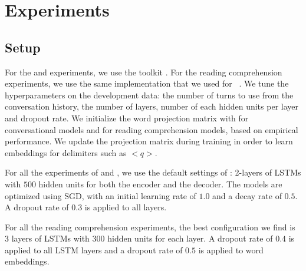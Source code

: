 
\section{Experiments}
\label{sec:coqa-experiments}

\subsection{Setup}
For the  and  experiments, we use the  toolkit \cite{klein2017opennmt}.
For the reading comprehension experiments, we use the same implementation that we used for ~\cite{chen2017reading}.
We tune the hyperparameters on the development data: the number of turns to use from the conversation history, the number of layers, number of each hidden units per layer and dropout rate.
We initialize the word projection matrix with  \cite{pennington2014glove} for conversational models and  \cite{bojanowski2017enriching} for reading comprehension models, based on empirical performance. We update the projection matrix during training in order to learn embeddings for delimiters such as $\mathrm{<}q\mathrm{>}$.

For all the experiments of  and , we use the default settings of : 2-layers of LSTMs with $500$ hidden units for both the encoder and the decoder. The models are optimized using SGD, with an initial learning rate of $1.0$ and a decay rate of $0.5$. A dropout rate of $0.3$ is applied to all layers.

For all the reading comprehension experiments, the best configuration we find is 3 layers of LSTMs with $300$ hidden units for each layer. A dropout rate of $0.4$ is applied to all LSTM layers and a dropout rate of $0.5$ is applied to word embeddings.

